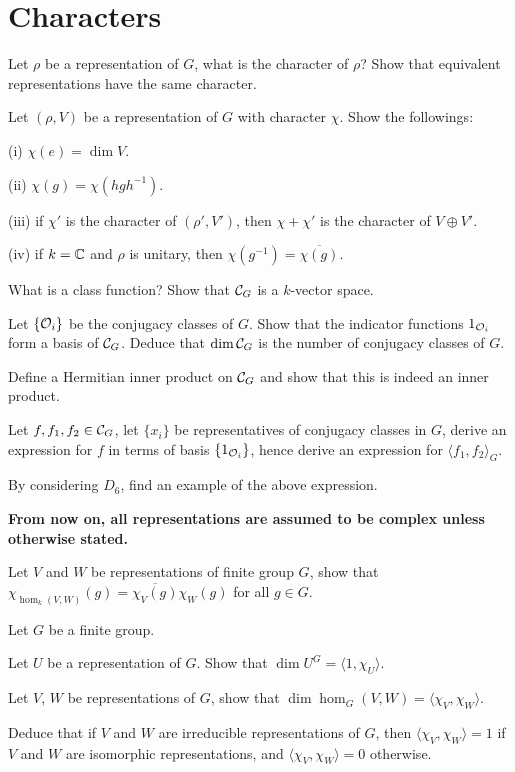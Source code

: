 \section{Characters}
\begin{question}{20}
	Let $\rho$ be a representation of $G$, what is the character of $\rho$? Show that equivalent representations have the same character.
	
	Let $(\rho,V)$ be a representation of $G$ with character $\chi$. Show the followings:
	
	(i) $\chi(e) = \dim V$.
	
	(ii) $\chi(g) = \chi(h g h^{-1})$.
	
	(iii) if $\chi'$ is the character of $(\rho',V')$, then $\chi + \chi'$ is the character of $V \oplus V'$.
	
	(iv) if $k = \mathbb{C}$ and $\rho$ is unitary, then $\chi(g^{-1}) = \overline{\chi(g)}$.
\end{question}

\begin{question}{21}
	What is a class function? Show that $\mathcal{C}_G$ is a $k$-vector space.
	
	Let $\{\mathcal{O}_i\}$ be the conjugacy classes of $G$. Show that the indicator functions $1_{\mathcal{O}_i}$ form a basis of $\mathcal{C}_G$. Deduce that $\dim \mathcal{C}_G$ is the number of conjugacy classes of $G$.
	
	Define a Hermitian inner product on $\mathcal{C}_G$ and show that this is indeed an inner product.
	
	Let $f,f_1,f_2 \in \mathcal{C}_G$, let $\{x_i\}$ be representatives of conjugacy classes in $G$, derive an expression for $f$ in terms of basis $\{1_{\mathcal{O}_i}\}$, hence derive an expression for $\langle f_1,f_2 \rangle_G$.
	
	By considering $D_6$, find an example of the above expression. 
\end{question}

\textbf{From now on, all representations are assumed to be complex unless otherwise stated.}

\begin{question}{22}
	Let $V$ and $W$ be  representations of finite group $G$, show that $\chi_{\hom_k(V,W)}(g) = \overline{\chi_V(g)} \chi_W(g)$ for all $g \in G$.
\end{question}

\begin{question}{23}
	Let $G$ be a finite group.
	
	Let $U$ be a representation of $G$. Show that $\dim U^G = \langle 1, \chi_U \rangle$.
	
	Let $V$, $W$ be representations of $G$, show that $\dim \hom_G(V,W) = \langle \chi_V,\chi_W \rangle$.
	
	Deduce that if $V$ and $W$ are irreducible representations of $G$, then $\langle \chi_V, \chi_W \rangle = 1$ if $V$ and $W$ are isomorphic representations, and $\langle \chi_V, \chi_W \rangle = 0$ otherwise.
\end{question}

